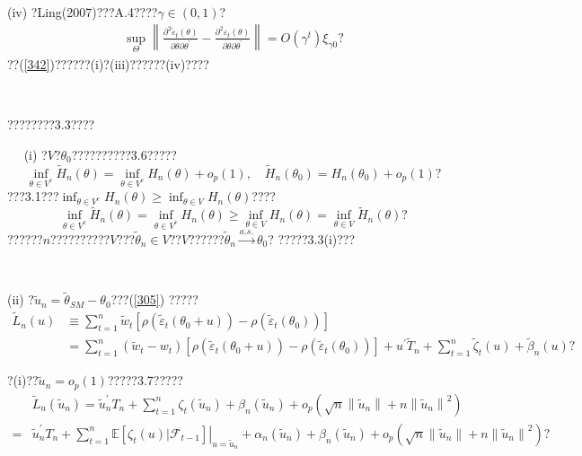 \documentclass[a4paper,12pt,openany,oneside,utf-8]{ctexbook}
\newcommand{\xiaosihao}{\fontsize{12pt}{\baselineskip}\selectfont}
\begin{document}
	\
	
	\noindent (iv) ?Ling(2007)???A.4????$\gamma\in(0,1)$?
	\begin{align}\label{342}
		\sup _{\Theta}\left\|\frac{\partial^{2} \tilde{\varepsilon}_{t}(\theta)}{\partial \theta \partial \theta^{\prime}}-\frac{\partial^{2} \varepsilon_{t}(\theta)}{\partial \theta \partial \theta^{\prime}}\right\|=O\left(\gamma^{t}\right) \xi_{\gamma 0}\mbox{?}
	\end{align}
	??(\ref{342})??????(i)?(iii)??????(iv)????
	
	\
	
	????????3.3????
	
	\noindent{\xiaosihao\heiti ??~3.3??}~~
	\noindent (i) ?$V$?$\theta_0$??????????3.6?????
	$$
	\inf _{\theta \in V^{c}} \tilde{H}_{n}(\theta)=\inf _{\theta \in V^{c}} H_{n}(\theta)+o_{p}(1),\quad
	\tilde{H}_{n}\left(\theta_{0}\right)=H_{n}\left(\theta_{0}\right)+o_{p}(1) \mbox{?}
	$$
	???3.1???$\inf_{\theta\in V^c}H_n(\theta)\ge\inf_{\theta\in V}H_n(\theta)$????
	$$\inf _{\theta \in V^{c}} \tilde{H}_{n}(\theta)=\inf _{\theta \in V^{c}} H_{n}(\theta)\ge\inf_{\theta\in V}H_n(\theta)=\inf_{\theta\in V}\tilde{H}_n(\theta)\mbox{?}$$
	??????$n$??????????$V$???$\tilde{\theta}_n\in V$??$V$??????$\tilde{\theta}_n\overset{a.s.}{\to}\theta_0$? ?????3.3(i)???
	
	\
	
	\noindent(ii) ?$\tilde{u}_{n}=\tilde{\theta}_{SM}-\theta_{0}$???(\ref{305}) ?????
	\begin{align}
		\tilde{L}_{n}(u) &\equiv \sum_{t=1}^{n} \tilde{w}_{t}\left[\rho\left(\tilde{\varepsilon}_{t}\left(\theta_{0}+u\right)\right)-\rho\left(\tilde{\varepsilon}_{t}\left(\theta_{0}\right)\right)\right]\nonumber\\
		&=\sum_{t=1}^{n}\left(\tilde{w}_{t}-w_{t}\right)\left[\rho\left(\tilde{\varepsilon}_{t}\left(\theta_{0}+u\right)\right)-\rho\left(\tilde{\varepsilon}_{t}\left(\theta_{0}\right)\right)\right]+u^{\prime} \tilde{T}_{n}+\sum_{t=1}^{n} \tilde{\zeta}_{t}(u)+\tilde{\beta}_{n}(u)\mbox{?}\nonumber
	\end{align}
	
	\noindent ?(i)??$\tilde{u}_n=o_p(1)$?????3.7?????
	\begin{align}
		&\tilde{L}_{n}\left(\tilde{u}_{n}\right)=\tilde{u}_{n}^{\prime} T_{n}+\sum_{t=1}^{n} \zeta_{t}\left(\tilde{u}_{n}\right)+\beta_{n}\left(\tilde{u}_{n}\right)+o_{p}\left(\sqrt{n}\left\|\tilde{u}_{n}\right\|+n\left\|\tilde{u}_{n}\right\|^{2}\right)\nonumber\\
		=&\tilde{u}_{n}^{\prime} T_{n}+\sum_{t=1}^{n} \mathbb{E}\left.\left[\zeta_{t}(u) | \mathcal{F}_{t-1}\right]\right|_{u=\tilde{u}_{n}}+\alpha_{n}\left(\tilde{u}_{n}\right)+\beta_{n}\left(\tilde{u}_{n}\right)+o_{p}\left(\sqrt{n}\left\|\tilde{u}_{n}\right\|+n\left\|\tilde{u}_{n}\right\|^{2}\right)\mbox{?} \nonumber
	\end{align}
	
\end{document}
